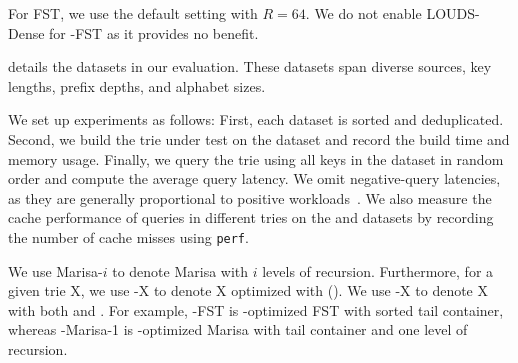  For FST, we use the default setting with $R =
64$.   We do not enable LOUDS-Dense for \csquared-FST as
it provides no benefit. 

  details the \numdatasets datasets in our
evaluation.  These datasets span diverse sources, key lengths, prefix depths,
and alphabet sizes.


 We set up experiments as follows: First, each dataset
is sorted and deduplicated. Second, we build the trie under test on the dataset
and record the build time and memory usage. Finally, we query the trie using all
keys in the dataset in random order and compute the average query latency. We
omit negative-query latencies, as they are generally proportional to positive
workloads~\cite{coco_1}. We also measure the cache performance of queries in
different tries on the \logdata and \wikidata datasets by recording the number
of cache misses using \texttt{perf}. 

 We use Marisa-$i$ to denote Marisa with $i$ levels of
recursion. Furthermore, for a given trie X, we use \bvdesign-X to denote X
optimized with \bvdesign (). We use \csquared-X to denote X
with both \bvdesign and \compressionscheme. For example, \bvdesign-FST is
\bvdesign-optimized FST with sorted tail container, whereas \csquared-Marisa-1
is \bvdesign-optimized Marisa with \fsst tail container and one level of
recursion.


